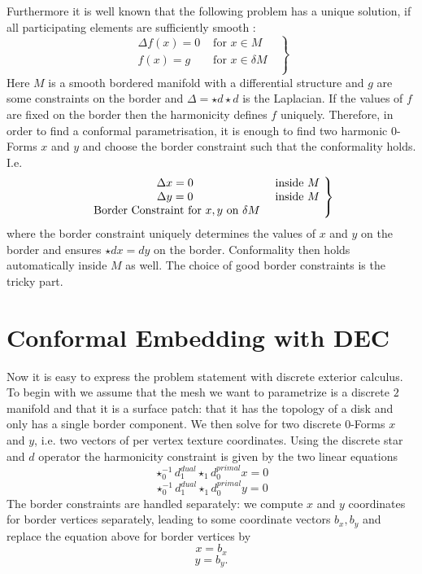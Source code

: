 Furthermore it is well known that the following problem has a unique solution, if all participating elements are sufficiently smooth :
\[\left.\begin{matrix}
 \Delta f(x) = 0 & \text{ for $x \in M$ } \\
  f(x) = g & \text{ for $x \in \delta M$ } \\
\end{matrix}\right\rbrace\]
Here $M$ is a smooth bordered manifold with a differential structure and $g$ are some constraints on the border and $\Delta = \star d\star d$ is the Laplacian. If the values of $f$ are fixed on the border then the harmonicity defines $f$ uniquely. Therefore, in order to find a conformal parametrisation, it is enough to find two harmonic 0-Forms $x$ and $y$ and choose the border constraint such that the conformality holds. I.e. 
\[\left.\begin{matrix}
 \Delta x = 0 & \text{ inside $ M$ } \\
 \Delta y = 0 & \text{ inside $ M$ } \\
 \text{ Border Constraint for $x,y$ on $ \delta M$} \\
\end{matrix}\right\rbrace\]
where the border constraint uniquely determines the values of $x$ and $y$ on the border and ensures $\star dx = dy$ on the border. Conformality then holds automatically inside $M$ as well.  The choice of good border constraints is the tricky part.


\section{Conformal Embedding with DEC}
Now it is easy to express the problem statement with discrete exterior calculus. To begin with we assume that the mesh we want to parametrize is a discrete $2$ manifold and that it is a surface patch: that it has the topology of a disk and only has a single border component. We then solve for two discrete $0$-Forms $x$ and $y$, i.e. two vectors of per vertex texture coordinates. Using the discrete star and $d$ operator the harmonicity constraint is given by the two linear equations
\[\star_0^{-1} d_1^{dual} \star_1 d_0^{primal} x = 0\]
\begin{equation}\star_0^{-1} d_1^{dual} \star_1 d_0^{primal} y = 0 \label{eq:conformal}\end{equation}
The border constraints are handled separately: we compute $x$ and $y$ coordinates for border vertices separately, leading to some coordinate vectors $b_x, b_y$ and  replace the equation above for border vertices by
\[ x = b_x\]
\[y = b_y.\]

